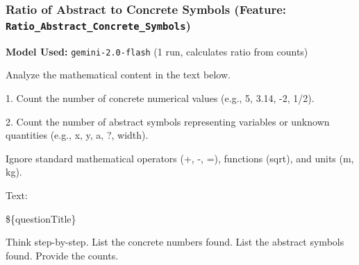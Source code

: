 \documentclass[
    a4paper, %
    10pt, %
    twoside, %
]{LTJournalArticle}
\begin{document}
\subsubsection{Ratio of Abstract to Concrete Symbols (Feature: \texttt{Ratio\_Abstract\_Concrete\_Symbols})}
\label{app:prompt_abstract_ratio}
\textbf{Model Used:} \texttt{gemini-2.0-flash} (1 run, calculates ratio from counts)
\begin{promptbox}
Analyze the mathematical content in the text below.

\vspace{1em}

1. Count the number of concrete numerical values (e.g., 5, 3.14, -2, 1/2).

2. Count the number of abstract symbols representing variables or unknown quantities (e.g., x, y, a, ?, width).

\vspace{1em}

Ignore standard mathematical operators (+, -, =), functions (sqrt), and units (m, kg).

\vspace{1em}

Text:

\$\{questionTitle\}

\vspace{1em}

Think step-by-step. List the concrete numbers found. List the abstract symbols found. Provide the counts.
\end{promptbox}
\end{document}
